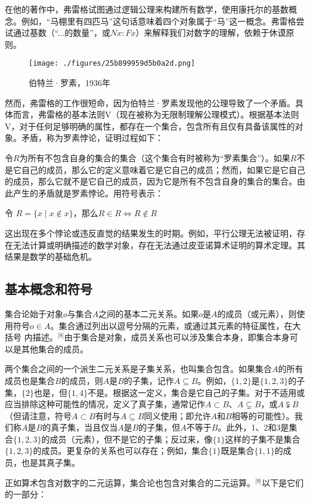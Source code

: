 在他的著作中，弗雷格试图通过逻辑公理来构建所有数学，使用康托尔的基数概念。例如，“马棚里有四匹马”这句话意味着四个对象属于“马”这一概念。弗雷格尝试通过基数（“...的数量”，或$Nx: Fx$）来解释我们对数字的理解，依赖于休谟原则。
\begin{figure}[ht]
\centering
\texttt{[image: ./figures/25b899959d5b0a2d.png]}
\caption{伯特兰·罗素，1936年} \label{fig_Set1_5}
\end{figure}
然而，弗雷格的工作很短命，因为伯特兰·罗素发现他的公理导致了一个矛盾。具体而言，弗雷格的基本法则V（现在被称为无限制理解公理模式）。根据基本法则V，对于任何足够明确的属性，都存在一个集合，包含所有且仅有具备该属性的对象。矛盾，称为罗素悖论，证明过程如下：

令$R$为所有不包含自身的集合的集合（这个集合有时被称为“罗素集合”）。如果$R$不是它自己的成员，那么它的定义意味着它是它自己的成员；然而，如果它是它自己的成员，那么它就不是它自己的成员，因为它是所有不包含自身的集合的集合。由此产生的矛盾就是罗素悖论。用符号表示：

令  
$R = \{x \mid x \notin x\}$，那么$R \in R \iff R \notin R$  

这出现在多个悖论或违反直觉的结果发生的时期。例如，平行公理无法被证明，存在无法计算或明确描述的数学对象，存在无法通过皮亚诺算术证明的算术定理。其结果是数学的基础危机。
\subsection{基本概念和符号}  
集合论始于对象$o$与集合$A$之间的基本二元关系。如果$o$是$A$的成员（或元素），则使用符号$o \in A$。集合通过列出以逗号分隔的元素，或通过其元素的特征属性，在大括号{ }内描述。\(^\text{[8]}\)由于集合是对象，成员关系也可以涉及集合本身，即集合本身可以是其他集合的成员。

两个集合之间的一个派生二元关系是子集关系，也叫集合包含。如果集合$A$的所有成员也是集合$B$的成员，则$A$是$B$的子集，记作$A \subseteq B$。例如，$\{1, 2\}$是$\{1, 2, 3\}$的子集，$\{2\}$也是，但$\{1, 4\}$不是。根据这一定义，集合是它自己的子集。对于不适用或应当排除这种可能性的情况，定义了真子集，通常记作$A \subset B$、$A \subsetneq B$，或$A \subsetneqq B$（但请注意，符号$A \subset B$有时与$A \subseteq B$同义使用；即允许$A$和$B$相等的可能性）。我们称$A$是$B$的真子集，当且仅当$A$是$B$的子集，但$A$不等于$B$。此外，1、2和3是集合$\{1, 2, 3\}$的成员（元素），但不是它的子集；反过来，像$\{1\}$这样的子集不是集合$\{1, 2, 3\}$的成员。更复杂的关系也可以存在；例如，集合$\{1\}$既是集合$\{1, {1}\}$的成员，也是其真子集。

正如算术包含对数字的二元运算，集合论也包含对集合的二元运算。\(^\text{[9]}\)以下是它们的一部分：


